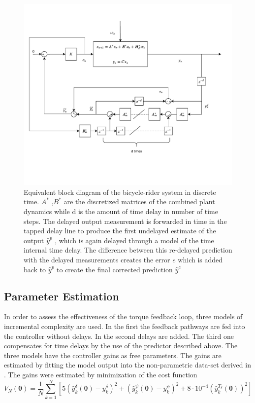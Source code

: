  \begin{figure}[ht]
    \centering
    \captionsetup{justification=centering,margin=2cm}

    \includegraphics[scale=0.6]{images/low_level_block.pdf}
    \caption{Equivalent block diagram of the bicycle-rider system in discrete time. \ensuremath{A^*} ,\ensuremath{B^*} are the discretized matrices of the combined plant dynamics while d is the amount of time delay in number of time steps. The delayed output measurement is forwarded in time in the tapped delay line to produce the first undelayed estimate of the output \ensuremath{\hat{y}^p} , which is again delayed through a model of the time internal time delay. The difference between this re-delayed prediction with the delayed measurements creates the error \ensuremath{e} which is added back to  \ensuremath{\hat{y}^p}  to create the final corrected prediction \ensuremath{\hat{y}^c} }
    \label{fig:paper4}
\end{figure}

\subsection{Parameter Estimation }

In order to assess the effectiveness of the torque feedback loop, three models of incremental complexity are used. In the first the feedback pathways are fed into the controller without delays. In the second delays are added. The third one compensates for time delays by the use of the predictor described above. The three models have the  controller gains as free parameters. The gains are estimated by fitting the model output into the non-parametric data-set derived in \cite{dialynaseffect}.  The gains were estimated by minimization of the cost function 
\begin{equation}
    V_{N}(\boldsymbol{\theta})=\frac{1}{N} \sum_{k=1}^{N}\left[5\left(\hat{y}^{\delta}_k(\mathbf{\theta})-y^\delta_k\right)^{2}+\left(\hat{y}^{\psi}_k(\mathbf{\theta})-y^\psi_k\right)^{2}+8\cdot10^{-4}\left(\hat{y}^{T_\delta}_k(\mathbf{\theta})\right)^2\right]
    \label{eq:cost}
    \end{equation}

